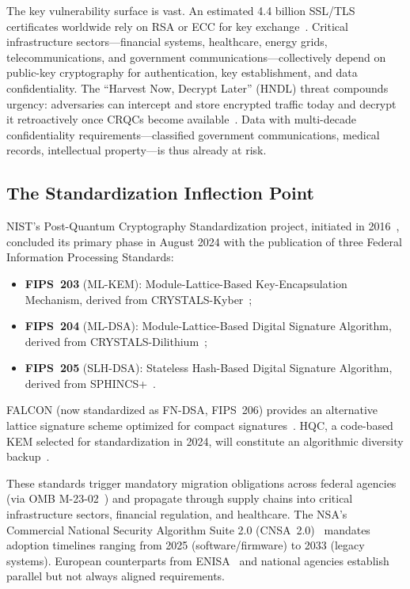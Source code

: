 \documentclass[journal]{IEEEtran}
\begin{document}
The key vulnerability surface is vast. An estimated 4.4 billion SSL/TLS
certificates worldwide rely on RSA or ECC for key exchange~\cite{netcraft2024survey}.
Critical infrastructure sectors---financial systems, healthcare, energy grids,
telecommunications, and government communications---collectively depend on
public-key cryptography for authentication, key establishment, and data
confidentiality. The ``Harvest Now, Decrypt Later'' (HNDL) threat
compounds urgency: adversaries can intercept and store encrypted traffic
today and decrypt it retroactively once CRQCs become available~\cite{chen2016report,
nsasuite2022}. Data with multi-decade confidentiality requirements---classified
government communications, medical records, intellectual property---is thus
already at risk.

\subsection{The Standardization Inflection Point}

NIST's Post-Quantum Cryptography Standardization project, initiated in
2016~\cite{nist2016call}, concluded its primary phase in August 2024 with the
publication of three Federal Information Processing Standards:
\begin{itemize}
  \item \textbf{FIPS~203} (ML-KEM): Module-Lattice-Based Key-Encapsulation
  Mechanism, derived from CRYSTALS-Kyber~\cite{nistfips203};
  \item \textbf{FIPS~204} (ML-DSA): Module-Lattice-Based Digital Signature
  Algorithm, derived from CRYSTALS-Dilithium~\cite{nistfips204};
  \item \textbf{FIPS~205} (SLH-DSA): Stateless Hash-Based Digital Signature
  Algorithm, derived from SPHINCS+~\cite{nistfips205}.
\end{itemize}
FALCON (now standardized as FN-DSA, FIPS~206) provides an alternative lattice
signature scheme optimized for compact signatures~\cite{nistfips206}.
HQC, a code-based KEM selected for standardization in 2024, will constitute
an algorithmic diversity backup~\cite{aragon2022hqc}.

These standards trigger mandatory migration obligations across federal agencies
(via OMB M-23-02~\cite{omb2023m2302}) and propagate through supply chains
into critical infrastructure sectors, financial regulation, and healthcare.
The NSA's Commercial National Security Algorithm Suite 2.0 (CNSA~2.0)~\cite{nsacnsa2022}
mandates adoption timelines ranging from 2025 (software/firmware) to 2033
(legacy systems). European counterparts from ENISA~\cite{enisa2022pqc} and
national agencies establish parallel but not always aligned requirements.
\end{document}
